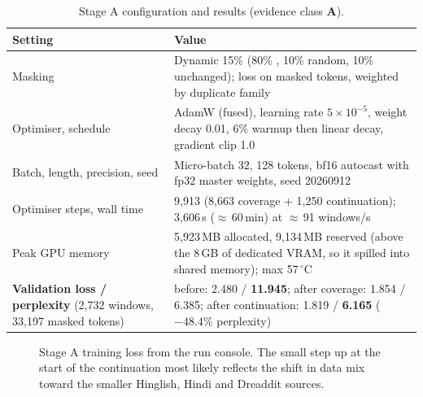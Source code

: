 \documentclass[11pt,a4paper]{article}
\newcommand{\codeus}{\textunderscore\allowbreak}
\DeclareRobustCommand{\code}[1]{{\ttfamily\let\_\codeus #1}}
\newcommand{\evA}{\textsf{\textbf{A}}}
\begin{document}
\begin{table}[!htbp]
\centering\small
\caption{Stage A configuration and results (evidence class \evA).}
\label{tab:stageA}
\begin{tabularx}{\linewidth}{@{}>{\raggedright\arraybackslash}p{5.8cm}X@{}}
\toprule
Setting & Value \\
\midrule
Masking & Dynamic 15\% (80\% \code{[MASK]}, 10\% random, 10\% unchanged); loss on masked tokens, weighted by duplicate family \\
Optimiser, schedule & AdamW (fused), learning rate $5\times10^{-5}$, weight decay 0.01, 6\% warmup then linear decay, gradient clip 1.0 \\
Batch, length, precision, seed & Micro-batch 32, 128 tokens, bf16 autocast with fp32 master weights, seed 20260912 \\
Optimiser steps, wall time & 9{,}913 (8{,}663 coverage + 1{,}250 continuation); 3{,}606\,s ($\approx$\,60\,min) at $\approx$\,91 windows/s \\
Peak GPU memory & 5{,}923\,MB allocated, 9{,}134\,MB reserved (above the 8\,GB of dedicated VRAM, so it spilled into shared memory); max 57\,$^\circ$C \\
\midrule
\textbf{Validation loss / perplexity} (2{,}732 windows, 33{,}197 masked tokens) & before: 2.480 / \textbf{11.945}; after coverage: 1.854 / 6.385; after continuation: 1.819 / \textbf{6.165} ($-48.4\%$ perplexity) \\
\bottomrule
\end{tabularx}
\end{table}

\begin{figure}[!htbp]
\centering
{}
\caption{Stage A training loss from the run console. The small step up at the start of the continuation
most likely reflects the shift in data mix toward the smaller Hinglish, Hindi and Dreaddit sources.}
\label{fig:stageA}
\end{figure}
\end{document}
